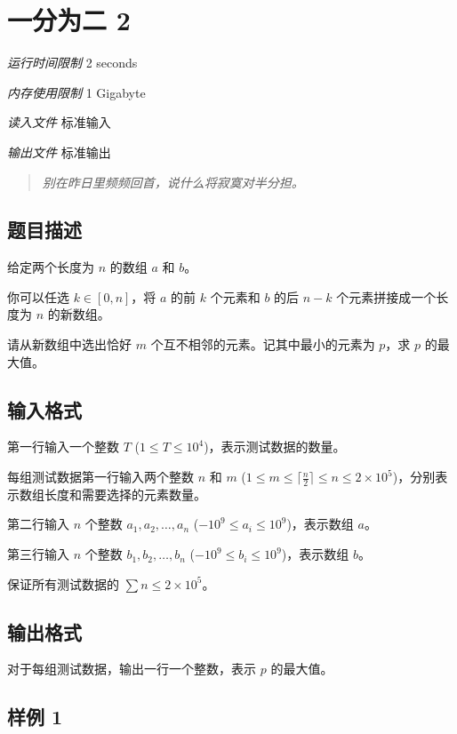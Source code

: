 \section[C. 一分为二 2]{ 一分为二 2}

\textit{运行时间限制}   2 seconds

\textit{内存使用限制} 1 Gigabyte

\textit{读入文件} \qquad 标准输入

\textit{输出文件} \qquad 标准输出


\begin{quote}
	\textit{别在昨日里频频回首，说什么将寂寞对半分担。}
\end{quote}

\subsection{题目描述}

给定两个长度为 $n$ 的数组 $a$ 和 $b$。

你可以任选 $k \in [0,n]$，将 $a$ 的前 $k$ 个元素和 $b$ 的后 $n-k$ 个元素拼接成一个长度为 $n$ 的新数组。

请从新数组中选出恰好 $m$ 个互不相邻的元素。记其中最小的元素为 $p$，求 $p$ 的最大值。

\subsection{输入格式}

第一行输入一个整数 $T$ ($1 \le T \le 10^4$)，表示测试数据的数量。

每组测试数据第一行输入两个整数 $n$ 和 $m$ ($1 \le m \le \lceil \frac{n}{2} \rceil \le n \le 2 \times 10^5$)，分别表示数组长度和需要选择的元素数量。

第二行输入 $n$ 个整数 $a_1, a_2, \ldots, a_n$ ($-10^9 \le a_i \le 10^9$)，表示数组 $a$。

第三行输入 $n$ 个整数 $b_1, b_2, \ldots, b_n$ ($-10^9 \le b_i \le 10^9$)，表示数组 $b$。

保证所有测试数据的 $\sum n \le 2 \times 10^5$。

\subsection{输出格式}

对于每组测试数据，输出一行一个整数，表示 $p$ 的最大值。

\subsection{样例 1}

